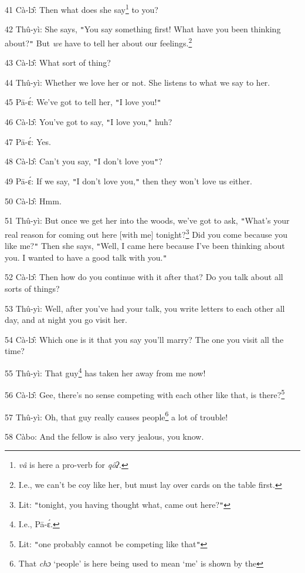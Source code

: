 41 Cà-lɔ̂: Then what does she say\footnote{\textit{vâ }is here a pro-verb for \textit{qôʔ}.} to you?

42 Thû-yì: She says, \texttt{"}You say something first! What have you been thinking
about?\texttt{"} But \textit{we} have to tell her about our feelings.\footnote{I.e., we can't be coy like her, but must lay over cards on the table first.}

43 Cà-lɔ̂: What sort of thing?

44 Thû-yì: Whether we love her or not. She listens to what we say to her.

45 Pā-ɛ́: We've got to tell her, \texttt{"}I love you!\texttt{"}

46 Cà-lɔ̂: You've got to say, \texttt{"}I love you,\texttt{"} huh?

47 Pā-ɛ́: Yes.

48 Cà-lɔ̂: Can't you say, \texttt{"}I don't love you\texttt{"}?

49 Pā-ɛ́: If we say, \texttt{"}I don't love you,\texttt{"} then they won't
love us either.

50 Cà-lɔ̂: Hmm.

51 Thû-yì: But once we get her into the woods, we've got to ask, \texttt{"}What's
your real reason for coming out here [with me] tonight?\footnote{Lit: \texttt{"}tonight, you having thought what, came out here?\texttt{"}} Did you come because
you like me?\texttt{"} Then she says, \texttt{"}Well, I came here because I've
been thinking about you. I wanted to have a good talk with you.\texttt{"}

52 Cà-lɔ̂: Then how do you continue with it after that? Do you talk about all
sorts of things?

53 Thû-yì: Well, after you've had your talk, you write letters to each other
all day, and at night you go visit her.

54 Cà-lɔ̂: Which one is it that you say you'll marry? The one you visit all
the time?

55 Thû-yì: That guy\footnote{I.e., Pā-ɛ́.} has taken her away from me now!

56 Cà-lɔ̂: Gee, there's no sense competing with each other like that, is there?\footnote{Lit: \texttt{"}one probably cannot be competing like that\texttt{"}}

57 Thû-yì: Oh, that guy really causes people\footnote{That \textit{chɔ} `people' is here being used to mean `me' is shown by the} a lot of trouble!

58 Càbo: And the fellow is also very jealous, you know.


